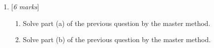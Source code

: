 \documentclass[11pt]{article}
\newcommand{\Q}[1]{\medskip\item {[{\em #1 marks\/}]}\ }
\newif\ifsol
\newcommand{\solution}[1]{{\ifsol \color{red} {#1} \fi}}
\begin{document}
\begin{enumerate}
\newpage
\Q{6} 
\begin{enumerate}
\item Solve part (a) of the previous question by the
master method.

\solution{
        $a = 2, b = 10, c = 1 / 2$. $2 < 10^{1 / 2}$ by master method $T(n) \in \Theta(\sqrt{n})$
}

\item Solve part (b) of the previous question by the
master method.

\solution{
        $a = 10, b = 3, c = 2$. $10 > 3^{2}$ by master method $T(n) \in \Theta(n^{\log_3 10})$
}

\end{enumerate}

\end{enumerate}
\end{document}
